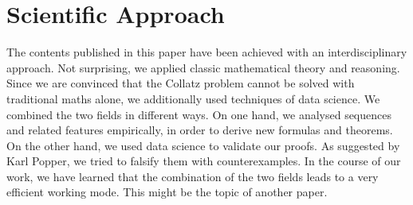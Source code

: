 \documentclass{SciPress_2015}
\begin{document}
\section{Scientific Approach}
\label{appx:scientific_approach}
The contents published in this paper have been achieved with an interdisciplinary approach. Not surprising, we applied classic mathematical theory and reasoning. Since we are convinced that the Collatz problem cannot be solved with traditional maths alone, we additionally used techniques of data science. We combined the two fields in different ways. On one hand, we analysed sequences and related features empirically, in order to derive new formulas and theorems. On the other hand, we used data science to validate our proofs. As suggested by Karl Popper, we tried to falsify them with counterexamples. In the course of our work, we have learned that the combination of the two fields leads to a very efficient working mode. This might be the topic of another paper.
\end{document}

